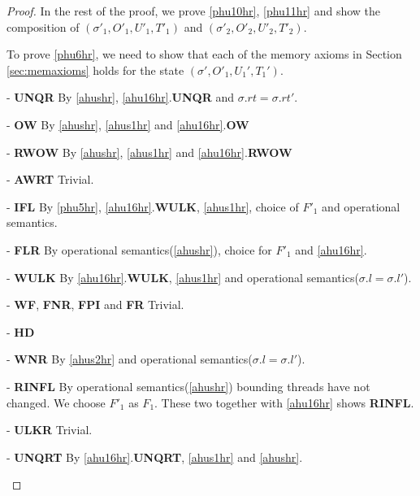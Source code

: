 \begin{proof}
In the rest of the proof, we prove \ref{phu10hr}, \ref{phu11hr} and show the composition of $(\sigma'_1, O'_1, U'_1,T'_1)$ and  $(\sigma'_2, O'_2, U'_2,T'_2)$. 

To prove \ref{phu6hr}, we need to show that each of the memory axioms in Section \ref{sec:memaxioms} holds for the state $(\sigma',O'_1,U_1',T_1')$.
\begin{case} - \textbf{UNQR} By \ref{ahushr}, \ref{ahu16hr}.\textbf{UNQR} and $\sigma.rt = \sigma.rt'$.
\end{case}
\begin{case} - \textbf{OW} By \ref{ahushr}, \ref{ahus1hr} and \ref{ahu16hr}.\textbf{OW}
\end{case}
\begin{case} - \textbf{RWOW} By \ref{ahushr}, \ref{ahus1hr} and \ref{ahu16hr}.\textbf{RWOW}
\end{case}
\begin{case} - \textbf{AWRT} Trivial. 
\end{case}
\begin{case} - \textbf{IFL}  By \ref{phu5hr}, \ref{ahu16hr}.\textbf{WULK}, \ref{ahus1hr}, choice of $F'_1$ and operational semantics.
\end{case}
\begin{case} - \textbf{FLR}  By operational semantics(\ref{ahushr}), choice for $F'_1$ and \ref{ahu16hr}. 
\end{case}
\begin{case} - \textbf{WULK}  By \ref{ahu16hr}.\textbf{WULK}, \ref{ahus1hr} and operational semantics($\sigma.l = \sigma.l'$).
\end{case}
\begin{case} - \textbf{WF}, \textbf{FNR}, \textbf{FPI} and \textbf{FR} Trivial.
\end{case}
\begin{case} - \textbf{HD} 
\end{case}
\begin{case} - \textbf{WNR} By \ref{ahus2hr} and operational semantics($\sigma.l = \sigma.l'$).
\end{case}
\begin{case} - \textbf{RINFL} By operational semantics(\ref{ahushr}) bounding threads have not changed. We choose $F'_1$ as $F_1$. These two together with \ref{ahu16hr} shows \textbf{RINFL}. 
\end{case}
\begin{case} - \textbf{ULKR} Trivial. 
\end{case}
\begin{case} - \textbf{UNQRT}  By \ref{ahu16hr}.\textbf{UNQRT}, \ref{ahus1hr} and \ref{ahushr}.
\end{case}


\end{proof}
